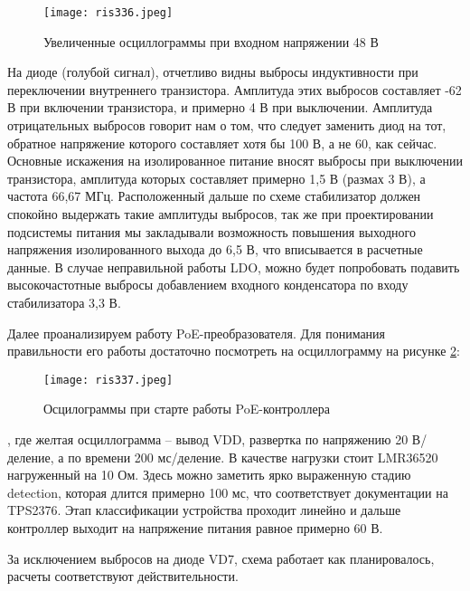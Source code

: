 \begin{figure}[H]
    \centering
    \texttt{[image: ris336.jpeg]}
    \caption{Увеличенные осциллограммы при входном напряжении 48 В}
    \label{ris:336}
\end{figure}

На диоде (голубой сигнал), отчетливо видны выбросы индуктивности при переключении внутреннего транзистора. 
Амплитуда этих выбросов составляет -62 В при включении транзистора, и примерно 4 В при выключении.
Амплитуда отрицательных выбросов говорит нам о том, что следует заменить диод на тот, обратное напряжение которого
составляет хотя бы 100 В, а не 60, как сейчас. Основные искажения на изолированное питание вносят выбросы при 
выключении транзистора, амплитуда которых составляет примерно 1,5 В (размах 3 В), а частота 66,67 МГц. 
Расположенный дальше по схеме стабилизатор должен спокойно выдержать такие амплитуды выбросов, так же при
проектировании подсистемы питания мы закладывали возможность повышения выходного напряжения изолированного 
выхода до 6,5 В, что вписывается в расчетные данные. В случае неправильной работы LDO, можно будет попробовать
подавить высокочастотные выбросы добавлением входного конденсатора по входу стабилизатора 3,3 В.

Далее проанализируем работу PoE-преобразователя. Для понимания правильности его работы достаточно посмотреть
на осциллограмму на рисунке \ref{ris:337}:

\begin{figure}[H]
    \centering
    \texttt{[image: ris337.jpeg]}
    \caption{Осцилограммы при старте работы PoE-контроллера}
    \label{ris:337}
\end{figure}

, где желтая осциллограмма -- вывод VDD, развертка по напряжению 20 В/деление, а по времени 200 мс/деление. 
В качестве нагрузки стоит LMR36520 нагруженный на 10 Ом.
Здесь можно заметить ярко выраженную стадию detection, которая длится 
примерно 100 мс, что соответствует документации на TPS2376. Этап классификации устройства проходит линейно и 
дальше контроллер выходит на напряжение питания равное примерно 60 В. 

За исключением выбросов на диоде VD7, схема работает как планировалось, расчеты соответствуют действительности.
